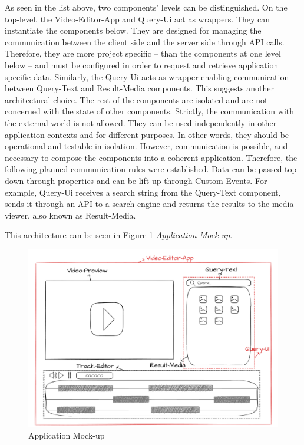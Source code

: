 As seen in the list above, two components’ levels can be distinguished. On the top-level, the Video-Editor-App and Query-Ui act as wrappers. They can instantiate the components below. They are designed for managing the communication between the client side and the server side through API calls. Therefore, they are more project specific – than the components at one level below – and must be configured in order to request and retrieve application specific data. Similarly, the Query-Ui acts as wrapper enabling communication between Query-Text and Result-Media components.
This suggests another architectural choice. The rest of the components are isolated and are not concerned with the state of other components. Strictly, the communication with the external world is not allowed. They can be used independently in other application contexts and for different purposes. In other words, they should be operational and testable in isolation.
However, communication is possible, and necessary to compose the components into a coherent application. Therefore, the following planned communication rules were established. Data can be passed top-down through properties and can be lift-up through Custom Events. For example, Query-Ui receives a search string from the Query-Text component, sends it through an API to a search engine and returns the results to the media viewer, also known as Result-Media.

This architecture can be seen in Figure \ref{fig:appMockUp} \emph{Application Mock-up}.

\begin{figure}[H]
\centering
\includegraphics[width=1\textwidth]{images/Wireframe.png}
\caption{Application Mock-up}
\label{fig:appMockUp}
\end{figure}

